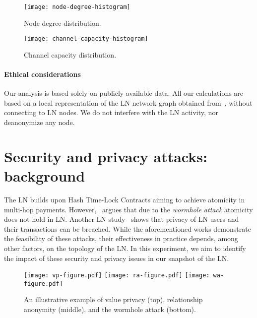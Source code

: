 \begin{figure}[tb]
	\centering
	\texttt{[image: node-degree-histogram]}
	\caption{Node degree distribution.}
	\label{fig:node-degree-histogram}
\end{figure}

\begin{figure}[tb]
	\centering
	\texttt{[image: channel-capacity-histogram]}
	\caption{Channel capacity distribution.}
	\label{fig:channel-capacity-histogram}
\end{figure}

\paragraph{Ethical considerations} 
Our analysis is based solely on publicly available data.
All our calculations are based on a local representation of the LN network graph obtained from~\cite{fiatjaf2020}, without connecting to LN nodes.
We do not interfere with the LN activity, nor deanonymize any node.


\section{Security and privacy attacks: background}
\label{sec:sec-priv-attacks}

The LN builds upon Hash Time-Lock Contracts aiming to achieve atomicity in multi-hop payments.
However,~\cite{Malavolta2019} argues that due to the \emph{wormhole attack} atomicity does not hold in LN\@.
Another LN study~\cite{Malavolta2017} shows that privacy of LN users and their transactions can be breached.
While the aforementioned works demonstrate the feasibility of these attacks, their effectiveness in practice depends, among other factors, on the topology of the LN\@.
In this experiment, we aim to identify the impact of these security and privacy issues in our snapshot of the LN\@.

\begin{figure*}[tb]
	\texttt{[image: vp-figure.pdf]}
	\vspace{0.3cm}
	\texttt{[image: ra-figure.pdf]}
	\vspace{0.3cm}
	\texttt{[image: wa-figure.pdf]}
	\caption{An illustrative example of value privacy (top), relationship anonymity (middle), and the wormhole attack (bottom).}
	\label{fig:wormhole-attack}
\end{figure*}

